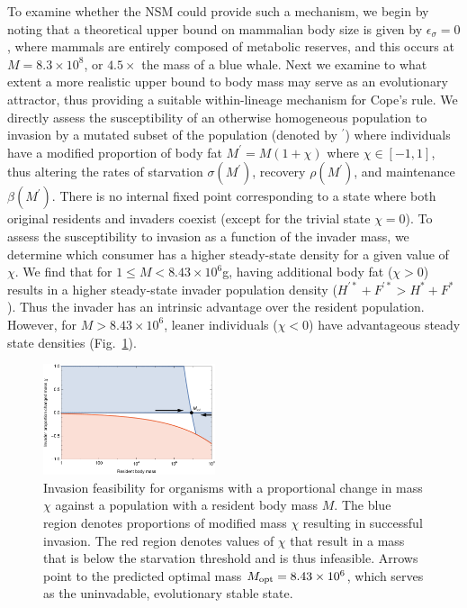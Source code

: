 \documentclass[twocolumn,preprintnumbers,amsmath,amssymb,superscriptaddress]{revtex4}
\begin{document}
To examine whether the NSM could provide such a mechanism, we begin by noting
that a theoretical upper bound on mammalian body size is given by
$\epsilon_\sigma=0$, where mammals are entirely composed of metabolic
reserves, and this occurs at $M=8.3\times 10^8$, or $4.5\times$ the mass of a
blue whale.  Next we examine to what extent a more realistic upper bound to
body mass may serve as an evolutionary attractor, thus providing a suitable
within-lineage mechanism for Cope's rule.  We directly assess the
susceptibility of an otherwise homogeneous population to invasion by a
mutated subset of the population (denoted by ${}^\prime$) where individuals
have a modified proportion of body fat $M^\prime=M(1+\chi)$ where
$\chi \in [-1,1]$, thus altering the rates of starvation $\sigma(M^\prime)$,
recovery $\rho(M^\prime)$, and maintenance $\beta(M^\prime)$.  There is no
internal fixed point corresponding to a state where both original residents
and invaders coexist (except for the trivial state $\chi=0$).  To assess the
susceptibility to invasion as a function of the invader mass, we determine
which consumer has a higher steady-state density for a given value of $\chi$.
We find that for $1\leq M<8.43\times 10^6$g, having additional body fat
($\chi > 0$) results in a higher steady-state invader population density
($H^{\prime *}+F^{\prime *}>H^*+F^*$).  Thus the invader has an intrinsic
advantage over the resident population.  However, for $M>8.43\times 10^6$,
leaner individuals ($\chi < 0$) have advantageous steady state densities
(Fig.~\ref{fig:invasion}).


\begin{figure}
\includegraphics[width=0.45\textwidth]{fig_Invasion.pdf}
\caption{\small Invasion feasibility for organisms with a proportional change
  in mass $\chi$ against a population with a resident body mass $M$.  The
  blue region denotes proportions of modified mass $\chi$ resulting in
  successful invasion.  The red region denotes values of $\chi$ that result
  in a mass that is below the starvation threshold and is thus infeasible.
  Arrows point to the predicted optimal mass $M_{\rm opt}=8.43\times 10^6$,
  which serves as the uninvadable, evolutionary stable state.}
\label{fig:invasion}
\end{figure}  
 
\end{document}
